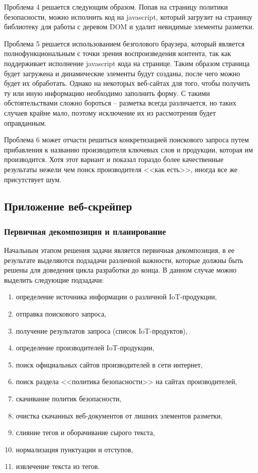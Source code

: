 \documentclass[../main]{subfiles}
\begin{document}
Проблема 4 решается следующим образом. Попав на страницу политики безопасности, можно исполнить код на javascript, который загрузит на страницу библиотеку для работы с деревом DOM и удалит невидимые элементы разметки.

Проблема 5 решается использованием безголового браузера, который является полнофункциональным с точки зрения воспроизведения контента, так как поддерживает исполнение javascript кода на странице. Таким образом страница будет загружена и динамические элементы будут созданы, после чего можно будет их обработать. Однако на некоторых веб-сайтах для того, чтобы получить ту или иную информацию необходимо заполнить форму. С такими обстоятельствами сложно бороться – разметка всегда различается, но таких случаев крайне мало, поэтому исключение их из рассмотрения будет оправданным.

Проблема 6 может отчасти решиться конкретизацией поискового запроса путем прибавления к названию производителя ключевых слов и продукции, которая им производится. Хотя этот вариант и показал гораздо более качественные результаты нежели чем поиск производителя <<как есть>>, иногда все же присутствует шум.

\subsection{Приложение веб-скрейпер}

\subsubsection{Первичная декомпозиция и планирование}

Начальным этапом решения задачи является первичная декомпозиция, в ее результате выделяются подзадачи различной важности, которые должны быть решены для доведения цикла разработки до конца. В данном случае можно выделить следующие подзадачи:
\begin{enumerate}
    \item определение источника информации о различной IoT-продукции,
    \item отправка поискового запроса,
    \item получение результатов запроса (список IoT-продуктов),
    \item определение производителей IoT-продукции,
    \item поиск официальных сайтов производителей в сети интернет,
    \item поиск раздела <<политика безопасности>> на сайтах производителей,
    \item скачивание политик безопасности,
    \item очистка скачанных веб-документов от лишних элементов разметки,
    \item слияние тегов и оборачивание сырого текста,
    \item нормализация пунктуации и отступов,
    \item извлечение текста из тегов.
\end{enumerate}
\end{document}
